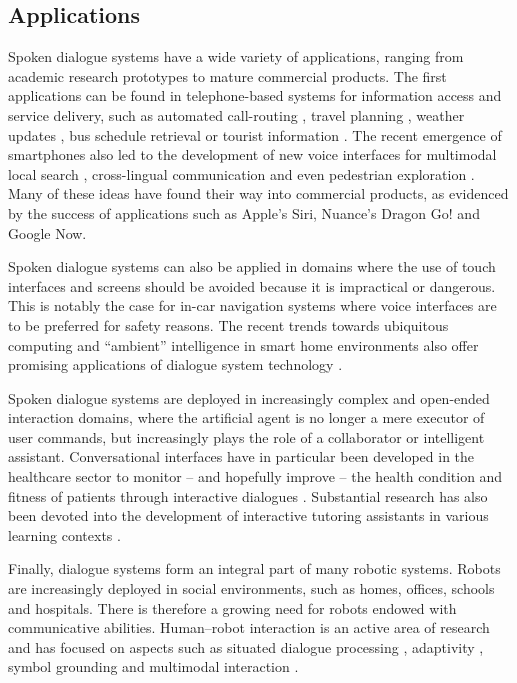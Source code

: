 \subsection{Applications}

Spoken dialogue systems have a wide variety of applications, ranging from academic research prototypes to mature commercial products. The first applications can be found in telephone-based systems for information access and service delivery, such as automated call-routing \citep{GorinRW97}, travel planning \citep{walker2001}, weather updates \citep{jupiter}, bus schedule retrieval \citep{RauxLBBE05} or tourist information \citep{lemon2006}.  The recent emergence of smartphones also led to the development of new voice interfaces for multimodal local search \citep{EhlenJ13}, cross-lingual communication \citep{yochina} and even pedestrian exploration  \citep{janarthanam2012integrating}.  Many of these ideas have found their way into commercial products, as evidenced by the success of applications such as Apple's Siri, Nuance's Dragon Go! and Google Now. 

Spoken dialogue systems can also be applied in domains where the use of touch interfaces and screens should be avoided because it is impractical or dangerous.  This is notably the case for in-car navigation systems \citep{cumove,CastronovoMPM10} where voice interfaces are to be preferred for safety reasons.  The recent trends towards ubiquitous computing and ``ambient'' intelligence in smart home environments also offer promising applications of dialogue system technology \citep{vipperla2009a,ambient2010}.

Spoken dialogue systems are deployed in increasingly complex and open-ended interaction domains, where the artificial agent is no longer a mere executor of user commands, but increasingly plays the role of a collaborator or intelligent assistant.  Conversational interfaces have in particular been developed in the healthcare sector to monitor -- and hopefully improve -- the health condition and fitness of patients through interactive dialogues \citep{BickmoreG06,Stahl:2009,MorbiniFDSTR12}.  Substantial research has also been devoted into the development of interactive tutoring assistants in various learning contexts \citep{ChiVLJ11,Dzikovska:2011,jan2011,TraumAAFGKLNS12}. 

Finally, dialogue systems form an integral part of many robotic systems.  Robots are increasingly deployed in social environments, such as homes, offices, schools and hospitals.  There is therefore a growing need for robots endowed with communicative abilities. Human--robot interaction is an active area of research and has focused on aspects such as situated dialogue processing \citep{CantrellSSW10,cosybook:dialogue}, adaptivity \citep{DoshiR08}, symbol grounding \citep{Roy05,lemaignan2012} and multimodal interaction \citep{stiefelhagen2004,salem2012,MirnigWSMGBGT13}.
 

